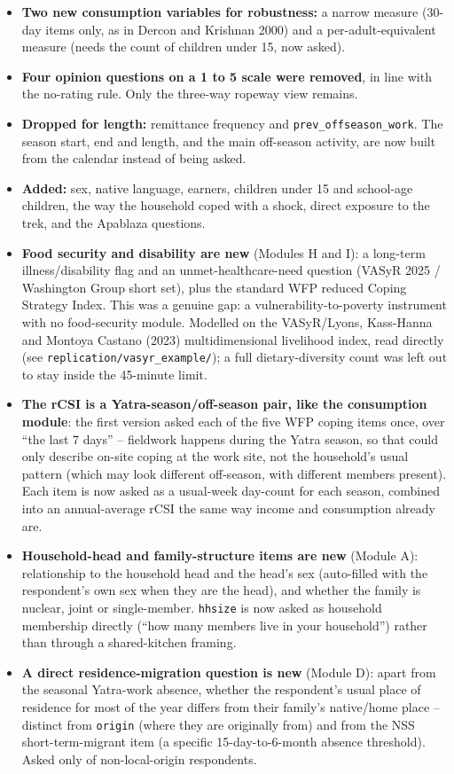 \documentclass[10pt]{article}
\begin{document}
\begin{itemize}[leftmargin=1.2em,itemsep=2pt]
\item \textbf{Two new consumption variables for robustness:} a narrow measure (30-day items only, as in Dercon and Krishnan 2000) and a per-adult-equivalent measure (needs the count of children under 15, now asked).
\item \textbf{Four opinion questions on a 1 to 5 scale were removed}, in line with the no-rating rule. Only the three-way ropeway view remains.
\item \textbf{Dropped for length:} remittance frequency and \texttt{prev\_offseason\_work}. The season start, end and length, and the main off-season activity, are now built from the calendar instead of being asked.
\item \textbf{Added:} sex, native language, earners, children under 15 and school-age children, the way the household coped with a shock, direct exposure to the trek, and the Apablaza questions.
\item \textbf{Food security and disability are new} (Modules H and I): a long-term illness/disability flag and an unmet-healthcare-need question (VASyR 2025 / Washington Group short set), plus the standard WFP reduced Coping Strategy Index. This was a genuine gap: a vulnerability-to-poverty instrument with no food-security module. Modelled on the VASyR/Lyons, Kass-Hanna and Montoya Castano (2023) multidimensional livelihood index, read directly (see \texttt{replication/vasyr\_example/}); a full dietary-diversity count was left out to stay inside the 45-minute limit.
\item \textbf{The rCSI is a Yatra-season/off-season pair, like the consumption module}: the first version asked each of the five WFP coping items once, over ``the last 7 days'' -- fieldwork happens during the Yatra season, so that could only describe on-site coping at the work site, not the household's usual pattern (which may look different off-season, with different members present). Each item is now asked as a usual-week day-count for each season, combined into an annual-average rCSI the same way income and consumption already are.
\item \textbf{Household-head and family-structure items are new} (Module A): relationship to the household head and the head's sex (auto-filled with the respondent's own sex when they are the head), and whether the family is nuclear, joint or single-member. \texttt{hhsize} is now asked as household membership directly (``how many members live in your household'') rather than through a shared-kitchen framing.
\item \textbf{A direct residence-migration question is new} (Module D): apart from the seasonal Yatra-work absence, whether the respondent's usual place of residence for most of the year differs from their family's native/home place -- distinct from \texttt{origin} (where they are originally from) and from the NSS short-term-migrant item (a specific 15-day-to-6-month absence threshold). Asked only of non-local-origin respondents.

\end{itemize}
\end{document}
